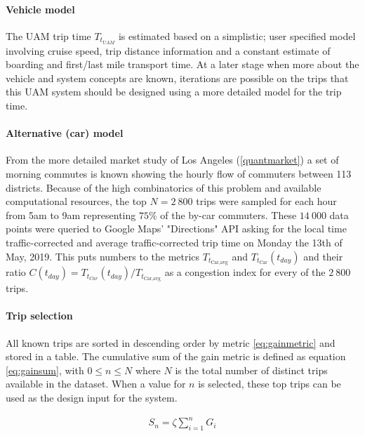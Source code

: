 \paragraph{Vehicle model}

The UAM trip time $T_{{t}_{UAM}}$ is estimated based on a simplistic; user specified model involving cruise speed, trip distance information and a constant estimate of boarding and first/last mile transport time. At a later stage when more about the vehicle and system concepts are known, iterations are possible on the trips that this UAM system should be designed using a more detailed model for the trip time.


\paragraph{Alternative (car) model}

From the more detailed market study of Los Angeles (\autoref{quantmarket}) a set of morning commutes is known showing the hourly flow of commuters between 113 districts. Because of the high combinatorics of this problem and available computational resources, the top $N = 2\ 800$ trips were sampled for each hour from 5am to 9am representing $75\%$ of the by-car commuters. These $14\ 000$ data points were queried to Google Maps' "Directions" API asking for the local time traffic-corrected and average traffic-corrected trip time on Monday the 13th of May, 2019. This puts numbers to the metrics $T_{t_\text{Car,avg}}$ and $T_{t_{\text{Car} }}(t_{day})$ and their ratio $C(t_{day}) = T_{t_{Car}}(t_{day}) / T_{t_\text{Car,avg}}$ as a congestion index for every of the $2\ 800$ trips.



\paragraph{Trip selection}
\label{subsec:tripselect}
All known trips are sorted in descending order by metric \ref{eq:gainmetric} and stored in a table. The cumulative sum of the gain metric is defined as equation \ref{eq:gainsum}, with $0\leq n\leq N$ where $N$ is the total number of distinct trips available in the dataset. When a value for $n$ is selected, these top trips can be used as the design input for the system.

\begin{align} \label{eq:gainsum}
    S_n = \zeta \sum_{i=1}^{n}{G_i}
\end{align}

